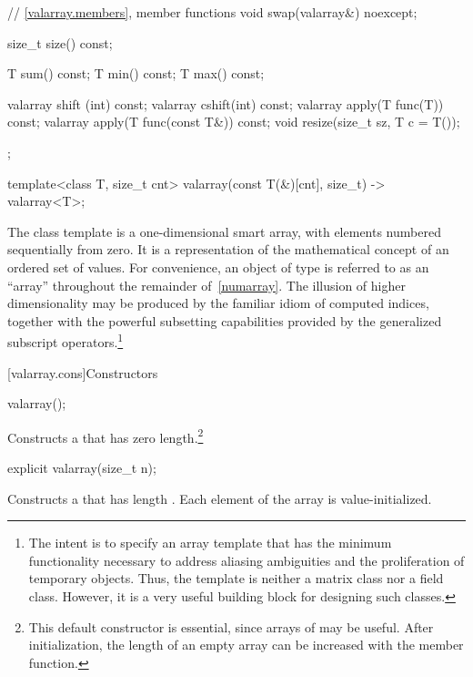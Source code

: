 \begin{codeblock}
{{    // \ref{valarray.members}, member functions
    void swap(valarray&) noexcept;

    size_t size() const;

    T sum() const;
    T min() const;
    T max() const;

    valarray shift (int) const;
    valarray cshift(int) const;
    valarray apply(T func(T)) const;
    valarray apply(T func(const T&)) const;
    void resize(size_t sz, T c = T());
  };

  template<class T, size_t cnt> valarray(const T(&)[cnt], size_t) -> valarray<T>;
}
\end{codeblock}

\pnum
The
class template
is a
one-dimensional smart array, with elements numbered sequentially from zero.
It is a representation of the mathematical concept
of an ordered set of values.
For convenience, an object of type  is referred
to as an ``array'' throughout the remainder of~\ref{numarray}.
The illusion of higher dimensionality
may be produced by the familiar idiom of computed indices, together
with the powerful subsetting capabilities provided
by the generalized subscript operators.\footnote{The intent is to specify
an array template that has the minimum functionality
necessary to address aliasing ambiguities and the proliferation of
temporary objects.
Thus, the
template is neither a
matrix class nor a field class.
However, it is a very useful building block for designing such classes.}

[valarray.cons]{Constructors}

%
\begin{itemdecl}
valarray();
\end{itemdecl}

\begin{itemdescr}
\pnum
\effects
Constructs a 
that has zero length.\footnote{This default constructor is essential,
since arrays of
may be useful.
After initialization, the length of an empty array can be increased with the
member function.}
\end{itemdescr}

%
\begin{itemdecl}
explicit valarray(size_t n);
\end{itemdecl}

\begin{itemdescr}
\pnum
\effects
Constructs a  that has length .
Each element of the array is value-initialized.
\end{itemdescr}

